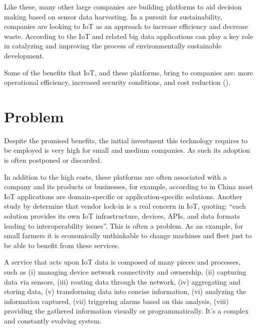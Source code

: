 Like these, many other large companies are building platforms to aid decision making based on sensor data harvesting. 
In a pursuit for sustainability, companies are looking to \gls{IoT} as an approach to increase efficiency and decrease waste. According to \cite{BIBRI2018230} the \gls{IoT} and related big data applications can play a key role in catalyzing and improving the process of environmentally sustainable development.

Some of the benefits that \gls{IoT}, and these platforms, bring to companies are: more operational efficiency, increased security conditions, and cost reduction (\cite{forbes-why-iot}).

\section{Problem}
\label{sec:introduction:problem}

Despite the promised benefits, the initial investment this technology requires to be employed is very high for small and medium companies. As such its adoption is often postponed or discarded.

In addition to the high costs, these platforms are often associated with a company and its products or businesses, for example, according to \cite{6851114} in China most \gls{IoT} applications are domain-specific or application-specific solutions. Another study by \cite{noura2019interoperability} determine that vendor lock-in is a real concern in \gls{IoT}, quoting: ``each solution provides its own IoT infrastructure, devices, APIs, and data formats leading to interoperability issues''.
This is often a problem. As an example, for small farmers it is economically unthinkable to change machines and fleet just to be able to benefit from these services.

A service that acts upon \gls{IoT} data is composed of many pieces and processes, such as (i) managing device network connectivity and ownership, (ii) capturing data via sensors, (iii) routing data through the network, (iv) aggregating and storing data, (v) transforming data into concise information, (vi)  analyzing the information captured, (vii) triggering alarms based on this analysis, (viii) providing the gathered information visually or programmatically. It's a complex and constantly evolving system.

